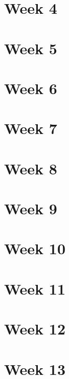\documentclass{article}
\begin{document}
\section{Week 4}

\section{Week 5}

\section{Week 6}

\section{Week 7}

\section{Week 8}

\section{Week 9}

\section{Week 10}

\section{Week 11}

\section{Week 12}

\section{Week 13}
\end{document}
